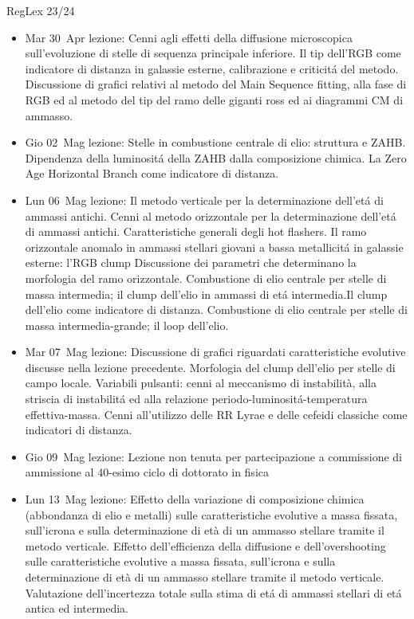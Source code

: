 \begin{frame}[allowframebreaks]{RegLex 23/24}
\begin{itemize}
\item Mar 30 Apr lezione: Cenni agli effetti della diffusione microscopica sull'evoluzione di stelle di sequenza principale inferiore. Il tip dell'RGB come indicatore di distanza in galassie esterne, calibrazione e criticit\'a del metodo. Discussione di grafici relativi al metodo del Main Sequence fitting, alla fase di RGB ed al metodo del tip del ramo delle giganti ross ed ai diagrammi CM di ammasso. 
\item Gio 02 Mag lezione: Stelle in combustione centrale di elio: struttura e ZAHB. Dipendenza della luminosit\'a della ZAHB dalla composizione chimica. La Zero Age Horizontal Branch come indicatore di distanza. 
\item Lun 06 Mag lezione: Il metodo verticale per la determinazione dell'et\'a di ammassi antichi. Cenni al metodo orizzontale per la determinazione dell'et\'a di ammassi antichi. Caratteristiche generali degli hot flashers. Il ramo orizzontale anomalo in ammassi stellari giovani a bassa metallicit\'a in galassie esterne: l'RGB clump Discussione dei parametri che determinano la morfologia del ramo orizzontale. Combustione di elio centrale per stelle di massa intermedia; il clump dell'elio in ammassi di et\'a intermedia.Il clump dell'elio come indicatore di distanza. Combustione di elio centrale per stelle di massa intermedia-grande; il loop dell'elio. 
\item Mar 07 Mag lezione: Discussione di grafici riguardati caratteristiche evolutive discusse nella lezione precedente. Morfologia del clump dell'elio per stelle di campo locale. Variabili pulsanti: cenni al meccanismo di instabilità, alla striscia di instabilit\'a ed alla relazione periodo-luminosit\'a-temperatura effettiva-massa. Cenni all'utilizzo delle RR Lyrae e delle cefeidi classiche come indicatori di distanza. 
\item Gio 09 Mag lezione: Lezione non tenuta per partecipazione a commissione di ammissione al 40-esimo ciclo di dottorato in fisica 
\item Lun 13 Mag lezione: Effetto della variazione di composizione chimica (abbondanza di elio e metalli) sulle caratteristiche evolutive a massa fissata, sull'icrona e sulla determinazione di età di un ammasso stellare tramite il metodo verticale. Effetto dell'efficienza della diffusione e dell'overshooting sulle caratteristiche evolutive a massa fissata, sull'icrona e sulla determinazione di età di un ammasso stellare tramite il metodo verticale. Valutazione dell'incertezza totale sulla stima di et\'a di ammassi stellari di et\'a antica ed intermedia. 

\end{itemize}
\end{frame}
